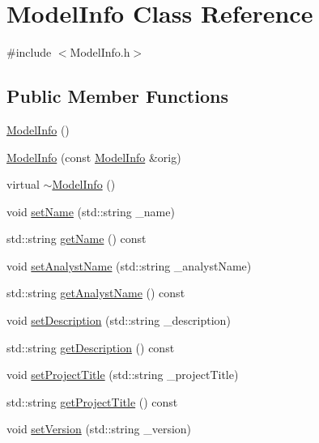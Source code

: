 \hypertarget{class_model_info}{}\section{Model\+Info Class Reference}
\label{class_model_info}


{\ttfamily \#include $<$Model\+Info.\+h$>$}

\subsection*{Public Member Functions}
\begin{DoxyCompactItemize}
\item 
\hyperlink{class_model_info_ad03680b2c68e69f149052f360bcb7c82}{Model\+Info} ()
\item 
\hyperlink{class_model_info_ad1babe6a54f88ac3a8cadd6ae244ba5a}{Model\+Info} (const \hyperlink{class_model_info}{Model\+Info} \&orig)
\item 
virtual \hyperlink{class_model_info_a91a20ea220fc4d2fd348732b88dbd1b1}{$\sim$\+Model\+Info} ()
\item 
void \hyperlink{class_model_info_a4dba4f92352fa30bf16d73afed5639a2}{set\+Name} (std\+::string \+\_\+name)
\item 
std\+::string \hyperlink{class_model_info_a562466f43f7995be34d74dc6dfd22985}{get\+Name} () const 
\item 
void \hyperlink{class_model_info_a1a88231e60dee818b999ed6680c3319a}{set\+Analyst\+Name} (std\+::string \+\_\+analyst\+Name)
\item 
std\+::string \hyperlink{class_model_info_a9cdad4bf93758de01d5e913f62f1640c}{get\+Analyst\+Name} () const 
\item 
void \hyperlink{class_model_info_aef42873b635386847532290b2dd45e42}{set\+Description} (std\+::string \+\_\+description)
\item 
std\+::string \hyperlink{class_model_info_ad98a56d449f906db347e50bead1f1610}{get\+Description} () const 
\item 
void \hyperlink{class_model_info_a1f9d87d6606b25a8472c67071f03e5a6}{set\+Project\+Title} (std\+::string \+\_\+project\+Title)
\item 
std\+::string \hyperlink{class_model_info_a1995a8639f6c33bff4e31c6b80247bb5}{get\+Project\+Title} () const 
\item 
void \hyperlink{class_model_info_a0e4743250a473b3af22ccefbb57d4a85}{set\+Version} (std\+::string \+\_\+version)
\item 

\end{DoxyCompactItemize}
